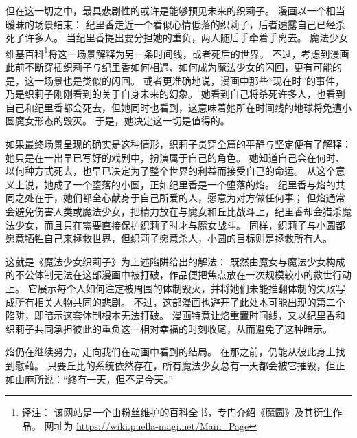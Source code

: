 但在这一切之中，最具悲剧性的或许是能够预见未来的织莉子。
漫画以一个相当暧昧的场景结束：
纪里香走近一个看似心情低落的织莉子，后者透露自己已经杀死了许多人。
当纪里香提出要分担她的重负，两人随后手牵着手离去。
魔法少女维基百科\footnote{%
    译注：
    该网站是一个由粉丝维护的百科全书，专门介绍《魔圆》及其衍生作品。
    网址为 \url{https://wiki.puella-magi.net/Main_Page}
}将这一场景解释为另一条时间线，或者死后的世界\cite{ref105}。
不过，考虑到漫画此前不断穿插织莉子与纪里香如何相遇、如何成为魔法少女的闪回，更有可能的是，这一场景也是类似的闪回。
或者更准确地说，漫画中那些“现在时”的事件，乃是织莉子刚刚看到的关于自身未来的幻象。
她看到自己将杀死许多人，也看到自己和纪里香都会死去，但她同时也看到，这意味着她所在时间线的地球将免遭小圆魔女形态的毁灭。
于是，她决定这一切是值得的。

如果最终场景呈现的确实是这种情形，织莉子贯穿全篇的平静与坚定便有了解释：
她只是在一出早已写好的戏剧中，扮演属于自己的角色。
她知道自己会在何时、以何种方式死去，也早已决定为了整个世界的利益而接受自己的命运。
从这个意义上说，她成了一个堕落的小圆，正如纪里香是一个堕落的焰。
纪里香与焰的共同之处在于，她们都全心献身于自己所爱的人，愿意为对方做任何事；
但焰通常会避免伤害人类或魔法少女，把精力放在与魔女和丘比战斗上，纪里香却会猎杀魔法少女，而且只在需要直接保护织莉子时才与魔女战斗。
同样，织莉子与小圆都愿意牺牲自己来拯救世界，但织莉子愿意杀人，小圆的目标则是拯救所有人。

这就是《魔法少女织莉子》为上述陷阱给出的解法：
既然由魔女与魔法少女构成的不公体制无法在这部漫画中被打破，作品便把焦点放在一次规模较小的救世行动上。
它展示每个人如何注定被周围的体制毁灭，并将她们未能推翻体制的失败写成所有相关人物共同的悲剧。
不过，这部漫画也避开了此处本可能出现的第二个陷阱，即暗示这套体制根本无法打破。
漫画特意让焰重置时间线，又以纪里香和织莉子共同承担彼此的重负这一相对幸福的时刻收尾，从而避免了这种暗示。

焰仍在继续努力，走向我们在动画中看到的结局。
在那之前，仍能从彼此身上找到慰藉。
只要丘比的系统依然存在，所有魔法少女总有一天都会被它摧毁，但正如由麻所说：“终有一天，但不是今天。”
